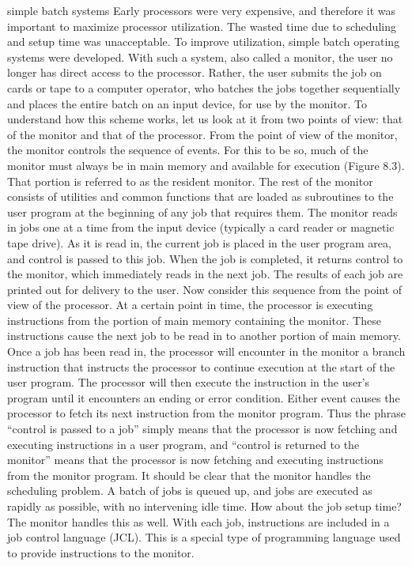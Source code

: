 simple batch systems Early processors were very expensive, and therefore it
was important to maximize processor utilization. The wasted time due to scheduling
and setup time was unacceptable.
To improve utilization, simple batch operating systems were developed. With
such a system, also called a monitor, the user no longer has direct access to the processor.
Rather, the user submits the job on cards or tape to a computer operator,
who batches the jobs together sequentially and places the entire batch on an input
device, for use by the monitor.
To understand how this scheme works, let us look at it from two points of
view: that of the monitor and that of the processor. From the point of view of the
monitor, the monitor controls the sequence of events. For this to be so, much of the
monitor must always be in main memory and available for execution (Figure 8.3).
That portion is referred to as the resident monitor. The rest of the monitor consists
of utilities and common functions that are loaded as subroutines to the user program
at the beginning of any job that requires them. The monitor reads in jobs one
at a time from the input device (typically a card reader or magnetic tape drive). As it
is read in, the current job is placed in the user program area, and control is passed to
this job. When the job is completed, it returns control to the monitor, which immediately
reads in the next job. The results of each job are printed out for delivery to
the user.
Now consider this sequence from the point of view of the processor. At a certain
point in time, the processor is executing instructions from the portion of main memory
containing the monitor. These instructions cause the next job to be read in to
another portion of main memory. Once a job has been read in, the processor will
encounter in the monitor a branch instruction that instructs the processor to continue
execution at the start of the user program. The processor will then execute
the instruction in the user’s program until it encounters an ending or error condition.
Either event causes the processor to fetch its next instruction from the monitor
program. Thus the phrase “control is passed to a job” simply means that the processor
is now fetching and executing instructions in a user program, and “control is
returned to the monitor” means that the processor is now fetching and executing
instructions from the monitor program.
It should be clear that the monitor handles the scheduling problem. A batch of
jobs is queued up, and jobs are executed as rapidly as possible, with no intervening
idle time.
How about the job setup time? The monitor handles this as well. With each
job, instructions are included in a job control language (JCL). This is a special type
of programming language used to provide instructions to the monitor.


